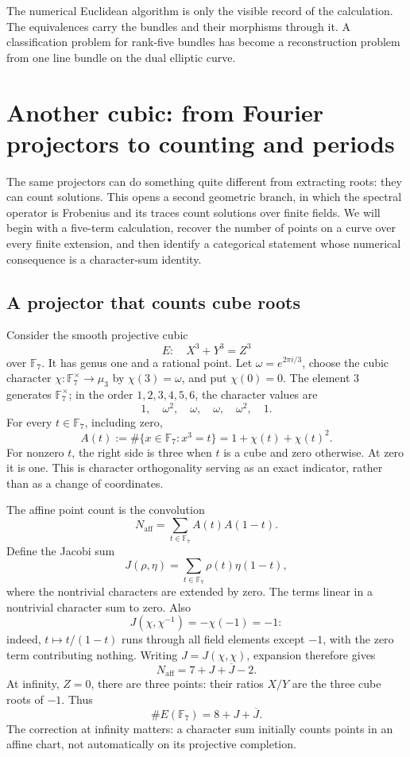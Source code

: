 \documentclass[11pt]{article}
\theoremstyle{remark}
\begin{document}
The numerical Euclidean algorithm is only the visible record of the calculation. The equivalences carry the bundles and their morphisms through it. A classification problem for rank-five bundles has become a reconstruction problem from one line bundle on the dual elliptic curve.

\section{Another cubic: from Fourier projectors to counting and periods}
\label{fermat:section}

The same projectors can do something quite different from extracting roots: they can count solutions. This opens a second geometric branch, in which the spectral operator is Frobenius and its traces count solutions over finite fields. We will begin with a five-term calculation, recover the number of points on a curve over every finite extension, and then identify a categorical statement whose numerical consequence is a character-sum identity.

\subsection{A projector that counts cube roots}

Consider the smooth projective cubic
\[
E:\quad X^3+Y^3=Z^3
\]
over \(\mathbb F_7\). It has genus one and a rational point. Let \(\omega=e^{2\pi i/3}\), choose the cubic character \(\chi:\mathbb F_7^\times\to\mu_3\) by \(\chi(3)=\omega\), and put \(\chi(0)=0\). The element \(3\) generates \(\mathbb F_7^\times\); in the order \(1,2,3,4,5,6\), the character values are
\[
1,\quad\omega^2,\quad\omega,\quad\omega,
\quad\omega^2,\quad1.
\]
For every \(t\in\mathbb F_7\), including zero,
\begin{equation}
A(t):=\#\{x\in\mathbb F_7:x^3=t\}
=1+\chi(t)+\chi(t)^2.
\label{fermat:cube-projector}
\end{equation}
For nonzero \(t\), the right side is three when \(t\) is a cube and zero otherwise. At zero it is one. This is character orthogonality serving as an exact indicator, rather than as a change of coordinates.

The affine point count is the convolution
\[
N_{\mathrm{aff}}=\sum_{t\in\mathbb F_7}A(t)A(1-t).
\]
Define the Jacobi sum
\[
J(\rho,\eta)=\sum_{t\in\mathbb F_7}\rho(t)\eta(1-t),
\]
where the nontrivial characters are extended by zero. The terms linear in a nontrivial character sum to zero. Also
\[
J(\chi,\chi^{-1})=-\chi(-1)=-1:
\]
indeed, \(t\mapsto t/(1-t)\) runs through all field elements except \(-1\), with the zero term contributing nothing. Writing \(J=J(\chi,\chi)\), expansion therefore gives
\[
N_{\mathrm{aff}}=7+J+\overline J-2.
\]
At infinity, \(Z=0\), there are three points: their ratios \(X/Y\) are the three cube roots of \(-1\). Thus
\begin{equation}
\#E(\mathbb F_7)=8+J+\overline J.
\label{fermat:count-jacobi}
\end{equation}
The correction at infinity matters: a character sum initially counts points in an affine chart, not automatically on its projective completion.
\end{document}
